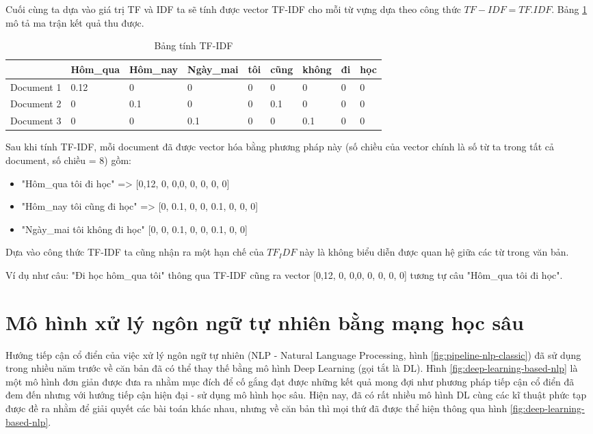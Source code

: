 Cuối cùng ta dựa vào giá trị TF và IDF ta sẽ tính được vector TF-IDF cho mỗi từ vựng dựa theo công thức \(TF-IDF = TF . IDF\). Bảng \ref{tab:sec3caltfidf} mô tả ma trận kết quả thu được.

\begin{table}[h!]
\centering
\begin{tabular}{|l|l|l|l|l|l|l|l|l|}
\hline
  & Hôm\_qua & Hôm\_nay & Ngày\_mai & tôi    & cũng   & không   & đi  & học \\ \hline
Document 1     & 0.12     & 0 & 0  & 0    & 0    & 0 & 0 & 0 \\ \hline
Document 2     & 0     & 0.1    & 0  & 0 & 0.1 & 0    & 0    & 0    \\ \hline
Document 3     & 0     & 0 & 0.1     & 0 & 0 & 0.1    & 0    & 0    \\ \hline
\end{tabular}
\caption{Bảng tính TF-IDF}
\label{tab:sec3caltfidf}
\end{table}
\newpage

Sau khi tính TF-IDF, mỗi document đã được vector hóa bằng phương pháp này (số chiều của vector chính là số từ ta trong tất cả document, số chiều = 8) gồm:

\begin{itemize}
    \item "Hôm\_qua tôi đi học" =>  [0,12, 0, 0,0, 0, 0, 0, 0]
    \item  "Hôm\_nay tôi cũng đi học" => [0, 0.1, 0, 0, 0.1, 0, 0, 0]
    \item "Ngày\_mai tôi không đi học" [0, 0, 0.1, 0, 0, 0.1, 0, 0]
\end{itemize}

Dựa vào công thức TF-IDF ta cũng nhận ra một hạn chế của $TF_IDF$ này là không biểu diễn được quan hệ giữa các từ trong văn bản.

Ví dụ như câu: "Đi học hôm\_qua tôi" thông qua TF-IDF cũng ra vector [0,12, 0, 0,0, 0, 0, 0, 0] tương tự câu "Hôm\_qua tôi đi học".

\section{Mô hình xử lý ngôn ngữ tự nhiên bằng mạng học sâu}
Hướng tiếp cận cổ điển của việc xử lý ngôn ngữ tự nhiên (NLP - Natural Language Processing, hình \ref{fig:pipeline-nlp-classic}) đã sử dụng trong nhiều năm trước về căn bản đã có thể thay thế bằng mô hình Deep Learning (gọi tắt là DL). Hình \ref{fig:deep-learning-based-nlp} là một mô hình đơn giản được đưa ra nhằm mục đích để  cố gắng đạt được những kết quả mong đợi như phương pháp tiếp cận cổ điển đã đem đến nhưng với hướng tiếp cận hiện đại - sử dụng mô hình học sâu. Hiện nay, đã có rất nhiều mô hình DL cùng các kĩ thuật phức tạp được đề ra nhằm để giải quyết các bài toán khác nhau, nhưng về căn bản thì mọi thứ đã được thể hiện thông qua hình \ref{fig:deep-learning-based-nlp}.

